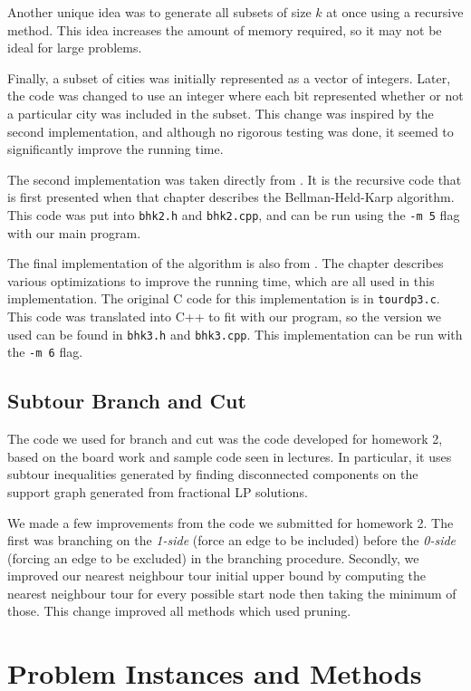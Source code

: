 \documentclass[11pt]{article}
\begin{document}
	Another unique idea was to generate all subsets of size $k$ at once using a recursive method. This idea increases the amount of memory required, so it may not be ideal for large problems.
	
	Finally, a subset of cities was initially represented as a vector of integers. Later, the code was changed to use an integer where each bit represented whether or not a particular city was included in the subset. This change was inspired by the second implementation, and although no rigorous testing was done, it seemed to significantly improve the running time.
	
	The second implementation was taken directly from \cite{bico}. It is the recursive code that is first presented when that chapter describes the Bellman-Held-Karp algorithm. This code was put into \texttt{bhk2.h} and \texttt{bhk2.cpp}, and can be run using the \texttt{-m 5} flag with our main program.
	
	The final implementation of the algorithm is also from \cite{bico}. The chapter describes various optimizations to improve the running time, which are all used in this implementation. The original C code for this implementation is in \texttt{tour{\textunderscore}dp3.c}. This code was translated into C++ to fit with our program, so the version we used can be found in \texttt{bhk3.h} and \texttt{bhk3.cpp}. This implementation can be run with the \texttt{-m 6} flag.
	
	\subsection{Subtour Branch and Cut}
	
	The code we used for branch and cut was the code developed for homework 2, based on the board work and sample code seen in lectures. In particular, it uses subtour inequalities generated by finding disconnected components on the support graph generated from fractional LP solutions.
	
	We made a few improvements from the code we submitted for homework 2. The first was branching on the \emph{1-side} (force an edge to be included) before the \emph{0-side} (forcing an edge to be excluded) in the branching procedure. Secondly, we improved our nearest neighbour tour initial upper bound by computing the nearest neighbour tour for every possible start node then taking the minimum of those. This change improved all methods which used pruning. 
	
	\section{Problem Instances and Methods}
	\label{sec:methodology}
		
\end{document}

